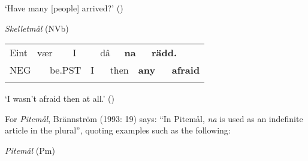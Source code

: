 \begin{styleTranslation}
‘Have many [people] arrived?’ (\citet[43]{Marklund1976})

\end{styleTranslation}

\begin{listWWNumileveli}
\item 

\begin{styleExample}
\textit{Skelletmål} (NVb)

\end{styleExample}

\end{listWWNumileveli}

\begin{tabular}{llllllllllll}
\lsptoprule
Eint & \multicolumn{2}{l}{vær

} & \multicolumn{2}{l}{I

} & \multicolumn{2}{l}{dâ

} & \multicolumn{2}{l}{{\bfseries na}

} & \multicolumn{2}{l}{{\bfseries rädd.}

} & \\
\multicolumn{2}{l}{NEG

} & \multicolumn{2}{l}{be.PST

} & \multicolumn{2}{l}{I

} & \multicolumn{2}{l}{then

} & \multicolumn{2}{l}{{\bfseries any}

} & \multicolumn{2}{l}{{\bfseries afraid}

}\\
\lspbottomrule
\end{tabular}

\begin{styleTranslation}
‘I wasn’t afraid then at all.’ (\citet[43]{Marklund1976})

\end{styleTranslation}

\begin{styleBodyTextFirst}
For \textit{Pitemål}, Brännström (1993: 19) says: “In Pitemål, \textit{na} is used as an indefinite article in the plural”, quoting examples such as the following:

\end{styleBodyTextFirst}

\begin{listWWNumileveli}
\item 

\begin{styleExample}
\textit{Pitemål }(Pm)

\end{styleExample}

\end{listWWNumileveli}

